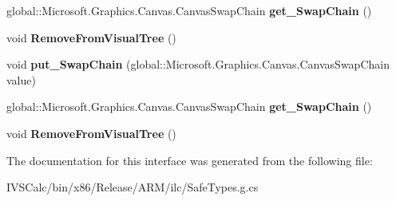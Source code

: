 \begin{DoxyCompactItemize}
global\+::\+Microsoft.\+Graphics.\+Canvas.\+Canvas\+Swap\+Chain {\bfseries get\+\_\+\+Swap\+Chain} ()
\item 
\mbox{\label{interface_microsoft_1_1_graphics_1_1_canvas_1_1_u_i_1_1_xaml_1_1_i_canvas_swap_chain_panel_ae575c5d7a21b21b168257ba3b5b70808}} 
void {\bfseries Remove\+From\+Visual\+Tree} ()
\item 
\mbox{\label{interface_microsoft_1_1_graphics_1_1_canvas_1_1_u_i_1_1_xaml_1_1_i_canvas_swap_chain_panel_a230dd3296100d776c02edcf9059cd075}} 
void {\bfseries put\+\_\+\+Swap\+Chain} (global\+::\+Microsoft.\+Graphics.\+Canvas.\+Canvas\+Swap\+Chain value)
\item 
\mbox{\label{interface_microsoft_1_1_graphics_1_1_canvas_1_1_u_i_1_1_xaml_1_1_i_canvas_swap_chain_panel_a25cb48bff645b2feae644bd69911025b}} 
global\+::\+Microsoft.\+Graphics.\+Canvas.\+Canvas\+Swap\+Chain {\bfseries get\+\_\+\+Swap\+Chain} ()
\item 
\mbox{\label{interface_microsoft_1_1_graphics_1_1_canvas_1_1_u_i_1_1_xaml_1_1_i_canvas_swap_chain_panel_ae575c5d7a21b21b168257ba3b5b70808}} 
void {\bfseries Remove\+From\+Visual\+Tree} ()
\end{DoxyCompactItemize}


The documentation for this interface was generated from the following file\+:\begin{DoxyCompactItemize}
\item 
I\+V\+S\+Calc/bin/x86/\+Release/\+A\+R\+M/ilc/Safe\+Types.\+g.\+cs\end{DoxyCompactItemize}
